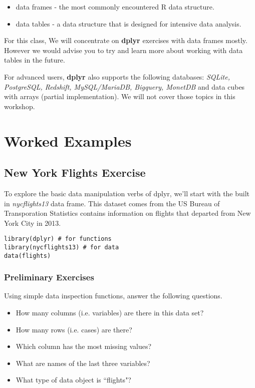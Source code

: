 \documentclass{article}
\begin{document}
\begin{itemize}
\item data frames - the  most commonly encountered R data structure. 
\item data tables - a data structure that is designed for intensive data analysis.
\end{itemize}

\noindent For this class, We will concentrate on \textbf{dplyr} exercises with data frames mostly. However we would advise you to try and learn more about working with data tables in the future.\\
\bigskip

\noindent For advanced users, \textbf{dplyr} also supports the following databases: \textit{SQLite, PostgreSQL, Redshift, MySQL/MariaDB, Bigquery, MonetDB} and data cubes with arrays (partial implementation). We will not cover those topics in this workshop.

\newpage
\section{Worked Examples}

\subsection*{New York Flights Exercise}

To explore the basic data manipulation verbs of dplyr, we’ll start with the built in \textit{nycflights13} data frame. This dataset comes from the US Bureau of Transporation Statistics contains information on flights that departed from New York City in 2013. 


\begin{framed}
\begin{verbatim}
library(dplyr) # for functions
library(nycflights13) # for data
data(flights)
\end{verbatim}
\end{framed}

\subsubsection*{Preliminary Exercises}
Using simple data inspection functions, answer the following questions.
\begin{itemize}
\item How many columns (i.e. variables) are there in this data set?
\item How many rows (i.e. cases) are there?
\item Which column has the most missing values?
\item What are names of the last three variables?
\item What type of data object is ``flights"?
\end{itemize}
\end{document}
